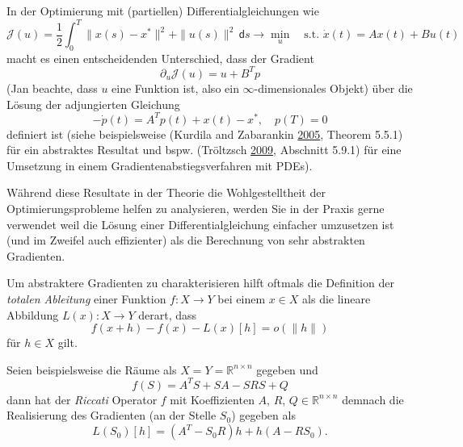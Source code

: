 \documentclass[
]{book}
\theoremstyle{definition}
\theoremstyle{definition}
\theoremstyle{definition}
\theoremstyle{definition}
\theoremstyle{remark}
\begin{document}
In der Optimierung mit (partiellen) Differentialgleichungen wie
\begin{equation*}
\mathcal J(u) = \frac 12 \int_0^T\|x(s)-x^*\|^2 + \|u(s)\|^2\,\mathsf{d}s\to \min_{u} \quad \text{s.t. }\dot x(t) =
Ax(t) + Bu(t)
\end{equation*}
macht es einen entscheidenden Unterschied, dass der Gradient
\[\partial_u \mathcal J(u) = u + B^Tp \]
(Jan beachte, dass \(u\) eine Funktion ist, also ein \(\infty\)-dimensionales
Objekt) über die Lösung der adjungierten Gleichung
\begin{equation*}
-\dot p(t) = A^T p(t) + x(t)-x^*, \quad p(T) = 0
\end{equation*}
definiert ist (siehe beispielsweise (Kurdila and Zabarankin \protect\hyperlink{ref-KurZ05}{2005}, Theorem 5.5.1) für ein
abstraktes Resultat und bspw. (Tröltzsch \protect\hyperlink{ref-Tr09}{2009}, Abschnitt 5.9.1) für eine
Umsetzung in einem Gradientenabstiegsverfahren mit PDEs).

Während diese Resultate in der Theorie die Wohlgestelltheit der
Optimierungsprobleme helfen zu analysieren, werden Sie in der Praxis gerne
verwendet weil die Lösung einer Differentialgleichung einfacher umzusetzen
ist (und im Zweifel auch effizienter) als die Berechnung von sehr abstrakten
Gradienten.

Um abstraktere Gradienten zu charakterisieren hilft oftmals die Definition der
\emph{totalen Ableitung} einer Funktion \(f\colon X\to Y\) bei einem \(x\in X\) als die lineare Abbildung \(L(x)\colon X\to Y\) derart, dass
\begin{equation*}
f(x+h) - f(x) - L(x)[h] = o(\| h\|)
\end{equation*}
für \(h\in X\) gilt.

Seien beispielsweise die Räume als \(X=Y=\mathbb R^{n\times n}\) gegeben und
\begin{equation}
f(S) = A^TS + SA -SRS + Q
\label{eq:eqn-ric-operator}
\end{equation}
dann hat der \emph{Riccati} Operator \(f\) mit Koeffizienten \(A\), \(R\), \(Q \in \mathbb R^{n\times n}\)
demnach die Realisierung des Gradienten (an der Stelle \(S_0\)) gegeben als
\begin{equation*}
L(S_0)[h] = (A^T-S_0R)h + h(A-RS_0).
\end{equation*}
\end{document}
